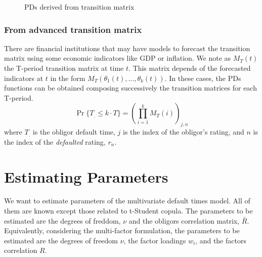 \documentclass[11pt,fleqn]{book} %
\begin{document}
\begin{figure}[ht]
	\centering
	\caption{PDs derived from transition matrix}
	\label{fig:pdftm}
\end{figure}

\subsection{From advanced transition matrix}

There are financial institutions that may have models to forecast 
the transition matrix using some economic indicators like GDP
or inflation. We note as $M_T(t)$ the T-period transition matrix
at time $t$. This matrix depends of the forecasted indicators at 
$t$ in the form $M_T(\theta_1(t),\dots,\theta_k(t))$. In these 
cases, the PDs functions can be obtained composing successively
the transition matrices for each T-period.
\begin{displaymath}
\Pr\{T_. \le k \cdot T\} = \left( \prod_{i=1}^{k} M_T(i) \right)_{j, n}
\end{displaymath}
where $T_.$ is the obligor default time, $j$ is the index of the obligor's
rating, and $n$ is the index of the \emph{defaulted} rating, $r_n$.


\chapter{Estimating Parameters}

We want to estimate parameters of the multivariate default times model.
All of them are known except those related to t-Student copula. The 
parameters to be estimated are the degrees of freddom, $\nu$ and the 
obligors correlation matrix, $\bar{R}$. Equivalently, considering the 
multi-factor formulation, the parameters to be estimated are the degrees
of freedom $\nu$, the factor loadings $w_i$, and the factors correlation
$R$.
\end{document}
